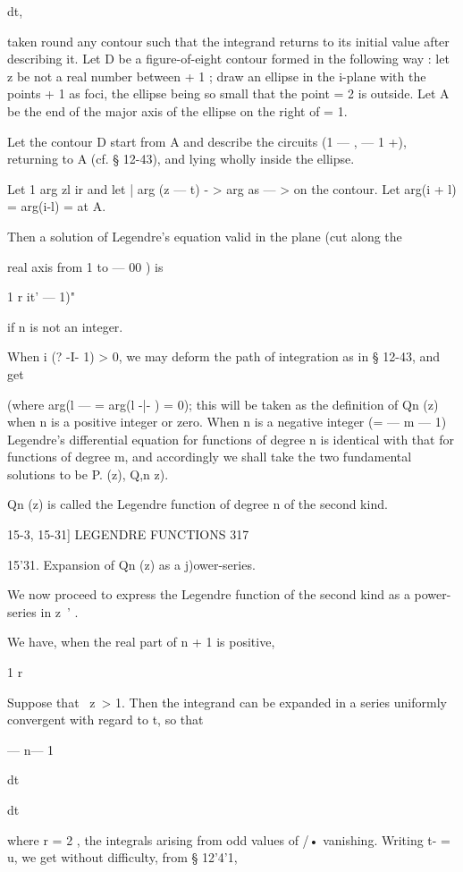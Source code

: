 {{dt,

taken round any contour such that the integrand returns to its initial
value after describing it. Let D be a figure-of-eight contour formed
in the following way : let z be not a real number between + 1 ; draw
an ellipse in the i-plane with the points + 1 as foci, the ellipse
being so small that the point = 2 is outside. Let A be the end of the
major axis of the ellipse on the right of = 1.

Let the contour D start from A and describe the circuits (1 — , — 1
+), returning to A (cf. § 12-43), and lying wholly inside the ellipse.

Let 1 arg zl ir and let | arg (z — t) - > arg as — > on the contour.
Let arg(i + l) = arg(i-l) = at A.

Then a solution of Legendre's equation valid in the plane (cut along
the

real axis from 1 to — 00 ) is

1 r it' — 1)"

if n is not an integer.

When i (? -I- 1) > 0, we may deform the path of integration as in §
12-43, and get

(where arg(l — = arg(l -|- ) = 0); this will be taken as the
definition of Qn (z) when n is a positive integer or zero. When n is a
negative integer (= — m — 1) Legendre's differential equation for
functions of degree n is identical with that for functions of degree
m, and accordingly we shall take the two fundamental solutions to be
P. (z), Q,n z).

Qn (z) is called the Legendre function of degree n of the second kind.

15-3, 15-31] LEGENDRE FUNCTIONS 317

15'31. Expansion of Qn (z) as a j)ower-series.

We now proceed to express the Legendre function of the second kind as
a power-series in z~' .

We have, when the real part of n + 1 is positive,

1 r

Suppose that \ z\ > 1. Then the integrand can be expanded in a series
uniformly convergent with regard to t, so that

— n— 1

dt

dt

where r = 2 , the integrals arising from odd values of /• vanishing.
Writing t- = u, we get without difficulty, from § 12'4'1,

}}
